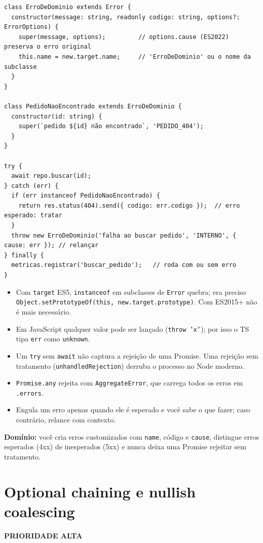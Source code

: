 \documentclass[12pt,a4paper,oneside]{book}
\newcommand{\alta}{\colorbox{red!15}{\sffamily\scriptsize\bfseries PRIORIDADE ALTA}}
\newcommand{\code}[1]{\texttt{#1}}
\newcommand{\dom}[1]{\begin{dominio}\textbf{Domínio:} #1\end{dominio}}
\begin{document}
\begin{verbatim}
class ErroDeDominio extends Error {
  constructor(message: string, readonly codigo: string, options?: ErrorOptions) {
    super(message, options);         // options.cause (ES2022) preserva o erro original
    this.name = new.target.name;     // 'ErroDeDominio' ou o nome da subclasse
  }
}

class PedidoNaoEncontrado extends ErroDeDominio {
  constructor(id: string) {
    super(`pedido ${id} não encontrado`, 'PEDIDO_404');
  }
}

try {
  await repo.buscar(id);
} catch (err) {
  if (err instanceof PedidoNaoEncontrado) {
    return res.status(404).send({ codigo: err.codigo });  // erro esperado: tratar
  }
  throw new ErroDeDominio('falha ao buscar pedido', 'INTERNO', { cause: err }); // relançar
} finally {
  metricas.registrar('buscar_pedido');   // roda com ou sem erro
}
\end{verbatim}

\begin{cuidado}[Armadilhas]
\begin{itemize}
  \item Com \code{target} ES5, \code{instanceof} em subclasses de \code{Error} quebra; era preciso \code{Object.setPrototypeOf(this, new.target.prototype)}. Com ES2015+ não é mais necessário.
  \item Em JavaScript qualquer valor pode ser lançado (\code{throw 'x'}); por isso o TS tipa \code{err} como \code{unknown}.
  \item Um \code{try} sem \code{await} não captura a rejeição de uma Promise. Uma rejeição sem tratamento (\code{unhandledRejection}) derruba o processo no Node moderno.
  \item \code{Promise.any} rejeita com \code{AggregateError}, que carrega todos os erros em \code{.errors}.
  \item Engula um erro apenas quando ele é esperado e você sabe o que fazer; caso contrário, relance com contexto.
\end{itemize}
\end{cuidado}

\dom{você cria erros customizados com \code{name}, código e \code{cause}, distingue erros esperados (4xx) de inesperados (5xx) e nunca deixa uma Promise rejeitar sem tratamento.}

\section{Optional chaining e nullish coalescing}
\label{sec:nullish}
\alta
\end{document}
